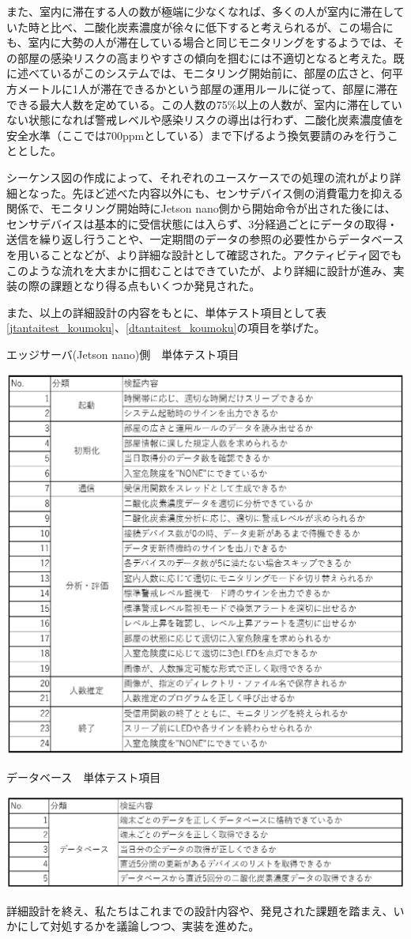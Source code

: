 また、室内に滞在する人の数が極端に少なくなれば、多くの人が室内に滞在していた時と比べ、二酸化炭素濃度が徐々に低下すると考えられるが、この場合にも、室内に大勢の人が滞在している場合と同じモニタリングをするようでは、その部屋の感染リスクの高まりやすさの傾向を掴むには不適切となると考えた。既に述べているがこのシステムでは、モニタリング開始前に、部屋の広さと、何平方メートルに1人が滞在できるかという部屋の運用ルールに従って、部屋に滞在できる最大人数を定めている。この人数の75\%以上の人数が、室内に滞在していない状態になれば警戒レベルや感染リスクの導出は行わず、二酸化炭素濃度値を安全水準（ここでは700ppmとしている）まで下げるよう換気要請のみを行うこととした。

シーケンス図の作成によって、それぞれのユースケースでの処理の流れがより詳細となった。先ほど述べた内容以外にも、センサデバイス側の消費電力を抑える関係で、モニタリング開始時にJetson nano側から開始命令が出された後には、センサデバイスは基本的に受信状態には入らず、3分経過ごとにデータの取得・送信を繰り返し行うことや、一定期間のデータの参照の必要性からデータベースを用いることなどが、より詳細な設計として確認された。アクティビティ図でもこのような流れを大まかに掴むことはできていたが、より詳細に設計が進み、実装の際の課題となり得る点もいくつか発見された。

また、以上の詳細設計の内容をもとに、単体テスト項目として表\ref{jtantaitest_koumoku}、\ref{dtantaitest_koumoku}の項目を挙げた。

\begin{table}[H]
	\centering
	\caption{エッジサーバ(Jetson nano)側　単体テスト項目}
	\includegraphics[width=15cm]{jtantaitest_koumoku.eps}
	\label{jtantaitest_koumoku}
\end{table}

\begin{table}[H]
	\centering
	\caption{データベース　単体テスト項目}
	\includegraphics[width=15cm]{dtantaitest_koumoku.eps}
	\label{dtantaitest_koumoku}
\end{table}

詳細設計を終え、私たちはこれまでの設計内容や、発見された課題を踏まえ、いかにして対処するかを議論しつつ、実装を進めた。